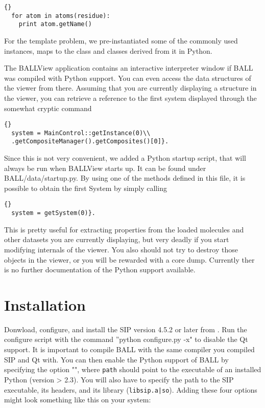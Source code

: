 \begin{lstlisting}{}
  for atom in atoms(residue):
    print atom.getName()
\end{lstlisting}

\noindent For the template problem, we pre-instantiated some of the 
commonly used instances, \eg {} maps to the 
 class and classes derived from it in Python.

The BALLView application contains an interactive interpreter window
if BALL was compiled with Python support. You can even access the
data structures of the viewer from there. Assuming that you are
currently displaying a structure in the viewer, you can retrieve a
reference to the first system displayed through the somewhat cryptic
command 

\begin{lstlisting}{}
  system = MainControl::getInstance(0)\\
  .getCompositeManager().getComposites()[0]}.
\end{lstlisting}

Since this is not very convenient, we added a Python startup script,
that will always be run when BALLView starts up. It can be found
under BALL/data/startup.py. By using one of the methods defined in this file,
it is possible to obtain the first System by simply calling \\

\begin{lstlisting}{}
  system = getSystem(0)}.
\end{lstlisting}

This is pretty useful for extracting properties from the loaded molecules
and other datasets you are
currently displaying, but very deadly if you start modifying internals
of the viewer. You also should not try to destroy those objects in the
viewer, or you will be rewarded with a core dump. Currently ther is no further
documentation of the Python support available.
		

\section{Installation}

Donwload, configure, and install the SIP version 4.5.2 or later from 
.
Run the configure script with the command ''python configure.py -x" to
disable the Qt support. It is important to compile BALL 
with the same \CPP compiler you compiled SIP and Qt with. You can then enable the Python support of BALL
by specifying the option \mbox{""}, where
{\tt path} should point to the executable of an installed Python (version >
2.3). You will also have to specify the path to the SIP executable, its
headers, and its library ({\tt libsip.a|so}). Adding these four options might
look something like this on your system:

